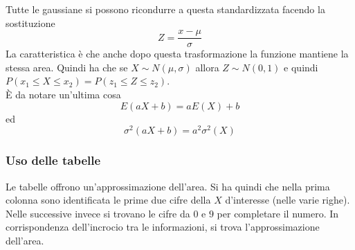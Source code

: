 Tutte le gaussiane si possono ricondurre a questa standardizzata facendo la sostituzione
\begin{equation*}
  Z = \frac{x-\mu}{\sigma}
\end{equation*}
La caratteristica è che anche dopo questa trasformazione la funzione mantiene la stessa area. 
Quindi ha che se $X\sim N(\mu,\sigma)$ allora $Z\sim N(0,1)$ e quindi $P(x_1\leq X\leq x_2) =
P(z_1\leq Z\leq z_2)$.\\
È da notare un'ultima cosa
\begin{equation*}
  E(aX+b) = aE(X)+b
\end{equation*}
ed
\begin{equation*}
  \sigma^2(aX+b) = a^2\sigma^2(X)
\end{equation*}

\subsubsection{Uso delle tabelle}
Le tabelle offrono un'approssimazione dell'area. Si ha quindi che nella prima colonna sono
identificata le prime due cifre della $X$ d'interesse (nelle varie righe). Nelle successive invece
si trovano le cifre da $0$ e $9$ per completare il numero. In corrispondenza dell'incrocio tra
le informazioni, si trova l'approssimazione dell'area.
